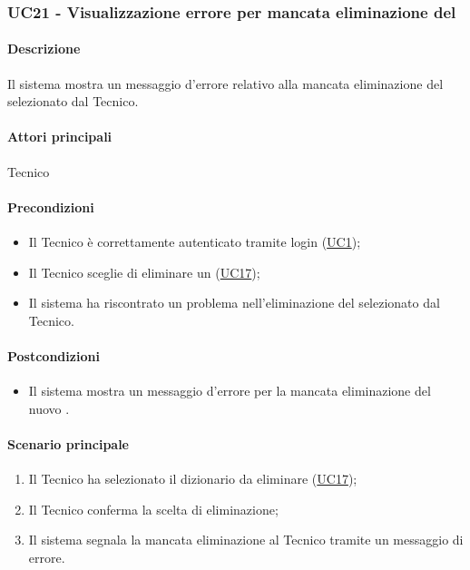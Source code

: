 \subsubsection{UC21 - Visualizzazione errore per mancata eliminazione del }\label{UC21}
\paragraph*{Descrizione}
Il sistema mostra un messaggio d’errore relativo alla mancata eliminazione del  selezionato dal Tecnico.

\paragraph*{Attori principali}
Tecnico

\paragraph*{Precondizioni}
\begin{itemize}
  \item Il Tecnico è correttamente autenticato tramite login (\hyperref[UC1]{UC1});
  \item Il Tecnico sceglie di eliminare un  (\hyperref[UC17]{UC17});
  \item Il sistema ha riscontrato un problema nell'eliminazione del  selezionato dal Tecnico.
\end{itemize}

\paragraph*{Postcondizioni}
\begin{itemize}
  \item Il sistema mostra un messaggio d’errore per la mancata eliminazione del nuovo .
\end{itemize}

\paragraph*{Scenario principale}
\begin{enumerate}
  \item Il Tecnico ha selezionato il dizionario da eliminare (\hyperref[UC17]{UC17});
  \item Il Tecnico conferma la scelta di eliminazione;
  \item Il sistema segnala la mancata eliminazione al Tecnico tramite un messaggio di errore.
\end{enumerate}